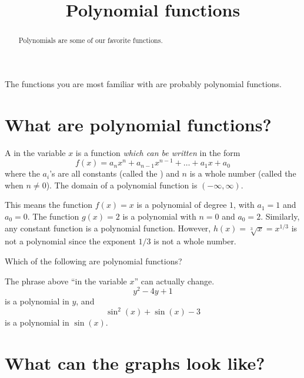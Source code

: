 \documentclass{ximera}
\title[Dig-In:]{Polynomial functions}
\begin{document}
\begin{abstract}
  Polynomials are some of our favorite functions. 
\end{abstract}
\maketitle


The functions you are most familiar with are probably polynomial
functions.

\section{What are polynomial functions?}

\begin{definition}
  A  in the variable $x$ is a function
  \emph{which can be written} in the form
  \[
  f(x) = a_nx^n + a_{n-1}x^{n-1} + \dots + a_1 x + a_0
  \]
  where the $a_i$'s are all constants (called the )
  and $n$ is a whole number (called the  when $n\ne
  0$). The domain of a polynomial function is $(-\infty,\infty)$.
\end{definition}

This means the function $f(x)=x$ is a polynomial of degree $1$, with $a_1 = 1$ and $a_0 = 0$. The function $g(x) = 2$ is a polynomial with $n=0$ and $a_0 = 2$. Similarly, any constant function is a polynomial function. However, $h(x) = \sqrt[3]{x} = x^{1/3}$ is not a polynomial since the exponent $1/3$ is not a whole number.
	
\begin{question}
  Which of the following are polynomial functions?
  \begin{selectAll}
  \end{selectAll}
\end{question}

The phrase above ``in the variable $x$'' can actually change.
\[
y^2-4y +1
\]
is a polynomial in $y$, and
\[
\sin^2(x) + \sin(x) -3 
\]
is a polynomial in $\sin(x)$.


\section{What can the graphs look like?}
\end{document}
